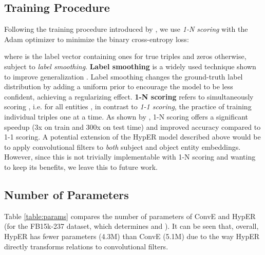 \documentclass[runningheads]{llncs}
\begin{document}
\subsection{Training Procedure}

Following the training procedure introduced by \cite{dettmers2017convolutional}, we use \emph{1-N scoring} with the Adam optimizer \cite{kingma2014adam} to minimize the binary cross-entropy loss:

where  is the label vector containing ones for true triples and zeros otherwise, subject to \emph{label smoothing}.  \textbf{Label smoothing} is a widely used technique shown to improve generalization \cite{szegedy2016rethinking,pereyra2017regularizing}. Label smoothing changes the ground-truth label distribution by adding a uniform prior to encourage the model to be less confident, achieving a regularizing effect. \textbf{1-N scoring} refers to simultaneously scoring , i.e. for all entities , in contrast to \emph{1-1 scoring}, the practice of training individual triples  one at a time. As shown by \cite{dettmers2017convolutional}, 1-N scoring offers a significant speedup (3x on train and 300x on test time) and improved accuracy compared to 1-1 scoring. A potential extension of the HypER model described above would be to apply convolutional filters to \emph{both} subject and object entity embeddings. However, since this is not trivially implementable with 1-N scoring and wanting to keep its benefits, we leave this to future work. 

\subsection{Number of Parameters}

Table \ref{table:params} compares the number of parameters of ConvE and HypER (for the FB15k-237 dataset, which determines  and ). It can be seen that, overall, HypER has fewer parameters (4.3M) than ConvE (5.1M) due to the way HypER directly transforms relations to convolutional filters.

\begin{table}[!htbp]
	\centering
	\caption{Comparison of number of parameters for ConvE and HypER on FB15k-237.  and  are height and width of the ConvE feature maps respectively.}
     \label{table:params}
      \vspace{-0.3cm}
 \end{table}
\end{document}
